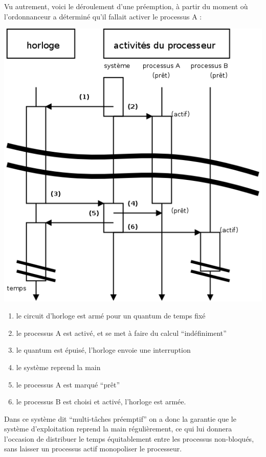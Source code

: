 \begin{multicols}{2}
Vu autrement, voici le déroulement d'une préemption, à partir du moment
où l'ordonnanceur a déterminé qu'il fallait activer le processus A :
\begin{center}
\includegraphics[width=\linewidth]{Figures/deroulement-preemption.png}
\end{center}


\begin{enumerate}
\item le circuit d'horloge est armé pour
un quantum de temps fixé
\item le processus A est activé, et se met à faire du calcul ``indéfiniment''
\item le quantum est épuisé, l'horloge envoie une interruption
\item le système reprend la main
\item le processus A est marqué ``prêt''
\item le processus B est choisi et activé, l'horloge est armée.
\end{enumerate}

Dans ce système dit ``multi-tâches préemptif'' on a donc la garantie que
le système d'exploitation reprend la main régulièrement, ce qui lui
donnera l'occasion de distribuer le temps équitablement entre les
processus non-bloqués, sans laisser un processus actif monopoliser le
processeur.



\end{multicols}
